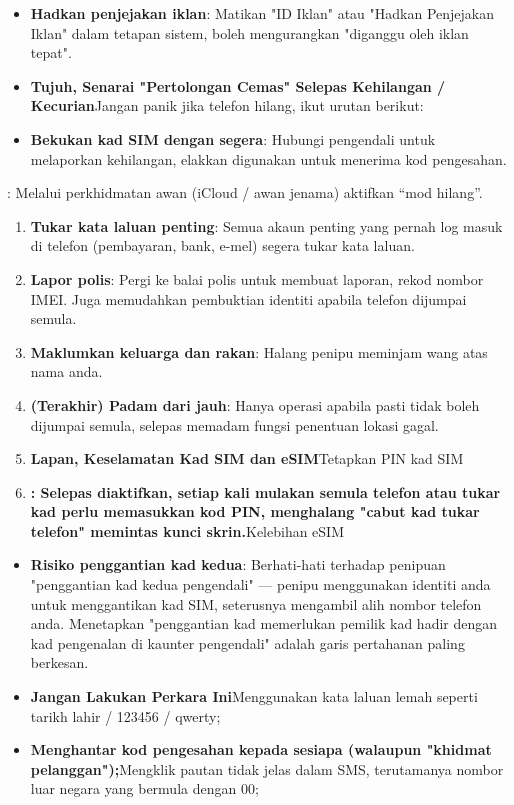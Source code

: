 
\begin{itemize}
  \item \textbf{Hadkan penjejakan iklan}: Matikan "ID Iklan" atau "Hadkan Penjejakan Iklan" dalam tetapan sistem, boleh mengurangkan "diganggu oleh iklan tepat".
  \item \textbf{Tujuh, Senarai "Pertolongan Cemas" Selepas Kehilangan / Kecurian}Jangan panik jika telefon hilang, ikut urutan berikut:
  \item \textbf{Bekukan kad SIM dengan segera}: Hubungi pengendali untuk melaporkan kehilangan, elakkan digunakan untuk menerima kod pengesahan.
\end{itemize}


: Melalui perkhidmatan awan (iCloud / awan jenama) aktifkan “mod hilang”.

\begin{enumerate}
  \item \textbf{Tukar kata laluan penting}: Semua akaun penting yang pernah log masuk di telefon (pembayaran, bank, e-mel) segera tukar kata laluan.
  \item \textbf{Lapor polis}: Pergi ke balai polis untuk membuat laporan, rekod nombor IMEI. Juga memudahkan pembuktian identiti apabila telefon dijumpai semula.
  \item \textbf{Maklumkan keluarga dan rakan}: Halang penipu meminjam wang atas nama anda.
  \item \textbf{(Terakhir) Padam dari jauh}: Hanya operasi apabila pasti tidak boleh dijumpai semula, selepas memadam fungsi penentuan lokasi gagal.
  \item \textbf{Lapan, Keselamatan Kad SIM dan eSIM}Tetapkan PIN kad SIM
  \item \textbf{: Selepas diaktifkan, setiap kali mulakan semula telefon atau tukar kad perlu memasukkan kod PIN, menghalang "cabut kad tukar telefon" memintas kunci skrin.}Kelebihan eSIM
\end{enumerate}


\begin{itemize}
  \item \textbf{Risiko penggantian kad kedua}: Berhati-hati terhadap penipuan "penggantian kad kedua pengendali" — penipu menggunakan identiti anda untuk menggantikan kad SIM, seterusnya mengambil alih nombor telefon anda. Menetapkan "penggantian kad memerlukan pemilik kad hadir dengan kad pengenalan di kaunter pengendali" adalah garis pertahanan paling berkesan.
  \item \textbf{Jangan Lakukan Perkara Ini}Menggunakan kata laluan lemah seperti tarikh lahir / 123456 / qwerty;
  \item \textbf{Menghantar kod pengesahan kepada sesiapa (walaupun "khidmat pelanggan");}Mengklik pautan tidak jelas dalam SMS, terutamanya nombor luar negara yang bermula dengan 00;
\end{itemize}

